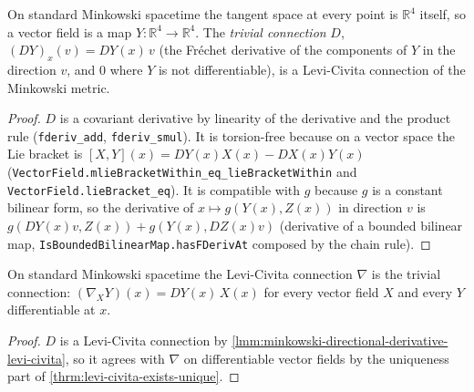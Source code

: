 \begin{lemma}
    \label{lmm:minkowski-directional-derivative-levi-civita}
    \leanok
    On standard Minkowski spacetime the tangent space at every point is $\mathbb{R}^4$ itself, so a vector field is a map $Y : \mathbb{R}^4 \to \mathbb{R}^4$. The \textit{trivial connection} $D$, $(DY)_x(v) = DY(x)\,v$ (the Fr\'echet derivative of the components of $Y$ in the direction $v$, and $0$ where $Y$ is not differentiable), is a Levi-Civita connection of the Minkowski metric.
\end{lemma}
\begin{proof}
    \leanok
    $D$ is a covariant derivative by linearity of the derivative and the product rule (\texttt{fderiv\_add}, \texttt{fderiv\_smul}). It is torsion-free because on a vector space the Lie bracket is $[X,Y](x) = DY(x)X(x) - DX(x)Y(x)$ (\texttt{VectorField.mlieBracketWithin\_eq\_lieBracketWithin} and \texttt{VectorField.lieBracket\_eq}). It is compatible with $g$ because $g$ is a constant bilinear form, so the derivative of $x \mapsto g(Y(x), Z(x))$ in direction $v$ is $g(DY(x)v, Z(x)) + g(Y(x), DZ(x)v)$ (derivative of a bounded bilinear map, \texttt{IsBoundedBilinearMap.hasFDerivAt} composed by the chain rule).
\end{proof}

\begin{lemma}
    \label{lmm:minkowski-levi-civita-flat}
    \leanok
    On standard Minkowski spacetime the Levi-Civita connection $\nabla$ is the trivial connection: $(\nabla_X Y)(x) = DY(x)\,X(x)$ for every vector field $X$ and every $Y$ differentiable at $x$.
\end{lemma}
\begin{proof}
    \leanok
    $D$ is a Levi-Civita connection by \ref{lmm:minkowski-directional-derivative-levi-civita}, so it agrees with $\nabla$ on differentiable vector fields by the uniqueness part of \ref{thrm:levi-civita-exists-unique}.
\end{proof}

